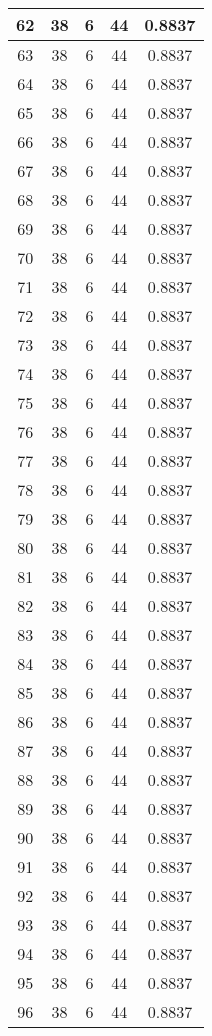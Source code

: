 \documentclass[letterpaper, 12pt]{article}
\begin{document}
\begin{longtable}{|c|c|c|c|c|}
\hline
62 & 38 & 6 & 44 & 0.8837 \\
\hline
63 & 38 & 6 & 44 & 0.8837 \\
\hline
64 & 38 & 6 & 44 & 0.8837 \\
\hline
65 & 38 & 6 & 44 & 0.8837 \\
\hline
66 & 38 & 6 & 44 & 0.8837 \\
\hline
67 & 38 & 6 & 44 & 0.8837 \\
\hline
68 & 38 & 6 & 44 & 0.8837 \\
\hline
69 & 38 & 6 & 44 & 0.8837 \\
\hline
70 & 38 & 6 & 44 & 0.8837 \\
\hline
71 & 38 & 6 & 44 & 0.8837 \\
\hline
72 & 38 & 6 & 44 & 0.8837 \\
\hline
73 & 38 & 6 & 44 & 0.8837 \\
\hline
74 & 38 & 6 & 44 & 0.8837 \\
\hline
75 & 38 & 6 & 44 & 0.8837 \\
\hline
76 & 38 & 6 & 44 & 0.8837 \\
\hline
77 & 38 & 6 & 44 & 0.8837 \\
\hline
78 & 38 & 6 & 44 & 0.8837 \\
\hline
79 & 38 & 6 & 44 & 0.8837 \\
\hline
80 & 38 & 6 & 44 & 0.8837 \\
\hline
81 & 38 & 6 & 44 & 0.8837 \\
\hline
82 & 38 & 6 & 44 & 0.8837 \\
\hline
83 & 38 & 6 & 44 & 0.8837 \\
\hline
84 & 38 & 6 & 44 & 0.8837 \\
\hline
85 & 38 & 6 & 44 & 0.8837 \\
\hline
86 & 38 & 6 & 44 & 0.8837 \\
\hline
87 & 38 & 6 & 44 & 0.8837 \\
\hline
88 & 38 & 6 & 44 & 0.8837 \\
\hline
89 & 38 & 6 & 44 & 0.8837 \\
\hline
90 & 38 & 6 & 44 & 0.8837 \\
\hline
91 & 38 & 6 & 44 & 0.8837 \\
\hline
92 & 38 & 6 & 44 & 0.8837 \\
\hline
93 & 38 & 6 & 44 & 0.8837 \\
\hline
94 & 38 & 6 & 44 & 0.8837 \\
\hline
95 & 38 & 6 & 44 & 0.8837 \\
\hline
96 & 38 & 6 & 44 & 0.8837 \\

\end{longtable}
\end{document}
